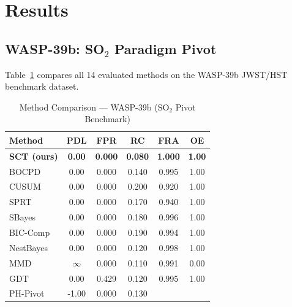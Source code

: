 \documentclass[conference]{IEEEtran}
\begin{document}
\section{Results}\label{sec:results}

\subsection{WASP-39b: \texorpdfstring{SO$_2$}{SO2} Paradigm Pivot}

Table~\ref{tab:results} compares all 14 evaluated methods on the WASP-39b JWST/HST benchmark dataset.

\begin{table}[htbp]
  \centering
  \caption{Method Comparison — WASP-39b ($\mathrm{SO}_2$ Pivot Benchmark)}
  \label{tab:results}
  \setlength{\tabcolsep}{3.5pt}
  \begin{tabular}{lccccc}
    \toprule
    \textbf{Method} & \textbf{PDL} & \textbf{FPR} & \textbf{RC} &
      \textbf{FRA} & \textbf{OE} \\
    \midrule
    \textbf{SCT (ours)} & \textbf{0.00} & \textbf{0.000} & \textbf{0.080}
      & \textbf{1.000} & \textbf{1.00} \\
    BOCPD               & 0.00          & 0.000          & 0.140
      & 0.995          & 1.00          \\
    CUSUM               & 0.00          & 0.000          & 0.200
      & 0.920          & 1.00          \\
    SPRT                & 0.00          & 0.000          & 0.170
      & 0.940          & 1.00          \\
    SBayes              & 0.00          & 0.000          & 0.180
      & 0.996          & 1.00          \\
    BIC-Comp            & 0.00          & 0.000          & 0.190
      & 0.994          & 1.00          \\
    NestBayes           & 0.00          & 0.000          & 0.120
      & 0.998          & 1.00          \\
    MMD                 & $\infty$      & 0.000          & 0.110
      & 0.991          & 0.00          \\
    GDT                 & 0.00          & 0.429          & 0.120
      & 0.995          & 1.00          \\
    PH-Pivot            & -1.00         & 0.000          & 0.130

\end{tabular}
\end{table}
\end{document}
